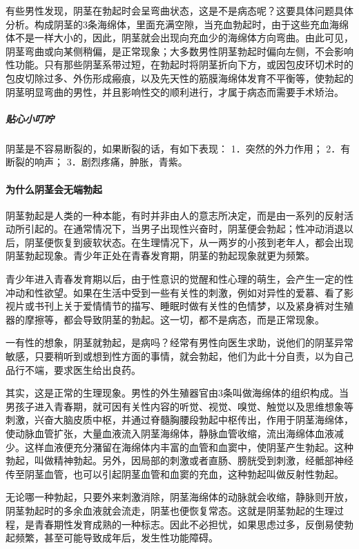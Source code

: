 有些男性发现，阴茎在勃起时会呈弯曲状态，这是不是病态呢？这要具体问题具体分析。构成阴茎的3条海绵体，里面充满空隙，当充血勃起时，由于这些充血海绵体不是一样大小的，因此，阴茎就会出现向充血少的海绵体方向弯曲。由此可见，阴茎弯曲或向某侧稍偏，是正常现象；大多数男性阴茎勃起时偏向左侧，不会影响性功能。只有那些阴茎系带过短，在勃起时将阴茎折向下方，或因包皮环切术时的包皮切除过多、外伤形成瘢痕，以及先天性的筋膜海绵体发育不平衡等，使勃起的阴茎明显弯曲的男性，并且影响性交的顺利进行，才属于病态而需要手术矫治。

\subparagraph{贴心小叮咛}

阴茎是不容易断裂的，如果断裂的话，有如下表现：
1．突然的外力作用；
2．有断裂的响声；
3．剧烈疼痛，肿胀，青紫。

\paragraph{为什么阴茎会无端勃起}

阴茎勃起是人类的一种本能，有时并非由人的意志所决定，而是由一系列的反射活动所引起的。在通常情况下，当男子出现性兴奋时，阴茎便会勃起；性冲动消退以后，阴茎便恢复到疲软状态。在生理情况下，从一两岁的小孩到老年人，都会出现阴茎勃起现象。青少年正处在青春发育期，阴茎的勃起现象就更为频繁。

青少年进入青春发育期以后，由于性意识的觉醒和性心理的萌生，会产生一定的性冲动和性欲望。如果在生活中受到一些有关性的刺激，例如对异性的爱慕、看了影视片或书刊上关于爱情情节的描写、睡眠时做有关性的色情梦，以及紧身裤对生殖器的摩擦等，都会导致阴茎的勃起。这一切，都不是病态，而是正常现象。

一有性的想象，阴茎就勃起，是病吗？经常有男性向医生求助，说他们的阴茎异常敏感，只要稍听到或想到性方面的事情，就会勃起，他们为此十分自责，以为自己品行不端，要求医生给出良药。

其实，这是正常的生理现象。男性的外生殖器官由3条叫做海绵体的组织构成。当男孩子进入青春期，就可因有关性内容的听觉、视觉、嗅觉、触觉以及思维想象等刺激，兴奋大脑皮质中枢，并通过脊髓胸腰段勃起中枢传出，作用于阴茎海绵体，使动脉血管扩张，大量血液流入阴茎海绵体，静脉血管收缩，流出海绵体血液减少。这样血液便充分潴留在海绵体内丰富的血管和血窦中，使阴茎产生勃起。这种勃起，叫做精神勃起。另外，因局部的刺激或者直肠、膀胱受到刺激，经骶部神经传至阴茎血管，也可以引起阴茎血管和血窦的充血，这种勃起叫做反射性勃起。

无论哪一种勃起，只要外来刺激消除，阴茎海绵体的动脉就会收缩，静脉则开放，阴茎勃起时的多余血液就会流走，阴茎也便恢复常态。这就是阴茎勃起的生理过程，是青春期性发育成熟的一种标志。因此不必担忧，如果思虑过多，反倒易使勃起频繁，甚至可能导致成年后，发生性功能障碍。

